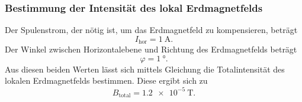 \subsubsection{Bestimmung der Intensität des lokal Erdmagnetfelds}
Der Spulenstrom, der nötig ist, um das Erdmagnetfeld zu
kompensieren, beträgt
\begin{equation*}
    I_\text{hor} = \SI{1}{\ampere}.
\end{equation*}
Der Winkel zwischen Horizontalebene und Richtung des Erdmagnetfelds
beträgt
\begin{equation*}
    \varphi = \SI{1}{\degree}.
\end{equation*}
Aus diesen beiden Werten lässt sich mittels Gleichung %
die Totalintensität des lokalen Erdmagnetfelds bestimmen.
Diese ergibt sich zu
\begin{equation*}
    B_\text{total} = \SI{1.2e-5}{\tesla}.
\end{equation*}